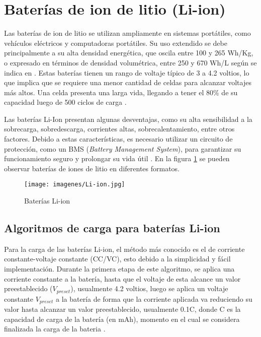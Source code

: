 \section{Baterías de ion de litio (Li-ion)}

Las baterías de ion de litio se utilizan ampliamente en sistemas portátiles,
 como vehículos eléctricos y computadoras portátiles. Su uso extendido se 
 debe principalmente a su alta densidad energética, que oscila entre 100 y 265 Wh/Kg,
  o expresado en términos de densidad volumétrica, entre 250 y 670 Wh/L según se indica en 
  \cite{noauthor_lithium-ion_nodate}. Estas baterías tienen un rango de voltaje típico de
   3 a 4.2 voltios, lo que implica que se requiere una menor cantidad de celdas para
alcanzar voltajes más altos. Una celda presenta una larga vida, llegando a tener el 80\%
de su capacidad luego de 500 ciclos de carga \cite{texas_instrumens_multi-chemistry_2022}.

Las baterías Li-Ion presentan algunas desventajas, como su alta sensibilidad a la sobrecarga,
sobredescarga, corrientes altas, sobrecalentamiento, entre otros factores. Debido a estas características,
es necesario utilizar un circuito de protección, como un BMS (\textit{Battery Management System}), para garantizar
su funcionamiento seguro y prolongar su vida útil \cite{texas_instrumens_multi-chemistry_2022}. En la figura 
\ref{fig:liion} se pueden observar baterías de iones de litio en diferentes formatos.

\begin{figure}[H]
   \centering
   \texttt{[image: imagenes/Li-ion.jpg]}
   \caption{Baterías Li-ion \cite{mk2010_english_2012} }
   \label{fig:liion}
\end{figure}


\subsection{Algoritmos de carga para baterías Li-ion}
\label{sec:alg_lion}
Para la carga de las baterías Li-ion, el método más conocido es el de corriente constante-voltaje constante (CC/VC), esto 
debido a la simplicidad y fácil implementación. Durante la primera etapa de este algoritmo, se aplica una corriente constante
a la batería, hasta que el voltaje de esta alcance un valor preestablecido ($V_{preset}$), usualmente 4.2 voltios, luego se aplica 
un voltaje constante $V_{preset}$ a la batería de forma que la corriente aplicada va reduciendo su valor hasta alcanzar un valor
preestablecido, usualmente 0.1C, donde C es la capacidad de carga de la batería (en mAh), momento en el cual se considera finalizada la 
carga de la bateria \cite{shen_charging_2012}.

